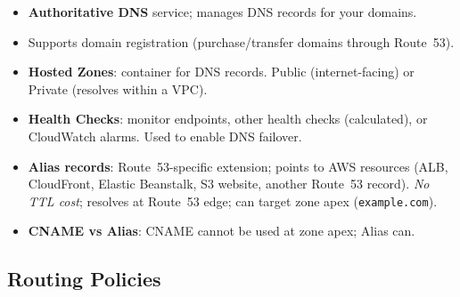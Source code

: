 

\begin{keyfacts}
\begin{itemize}
  \item \textbf{Authoritative DNS} service; manages DNS records for your domains.
  \item Supports domain registration (purchase/transfer domains through Route~53).
  \item \textbf{Hosted Zones}: container for DNS records. Public (internet-facing) or
        Private (resolves within a VPC).
  \item \textbf{Health Checks}: monitor endpoints, other health checks (calculated), or
        CloudWatch alarms. Used to enable DNS failover.
  \item \textbf{Alias records}: Route~53-specific extension; points to AWS resources
        (ALB, CloudFront, Elastic Beanstalk, S3 website, another Route~53 record).
        \emph{No TTL cost}; resolves at Route~53 edge; can target zone apex (\texttt{example.com}).
  \item \textbf{CNAME vs Alias}: CNAME cannot be used at zone apex; Alias can.
\end{itemize}
\end{keyfacts}

\subsection{Routing Policies}

